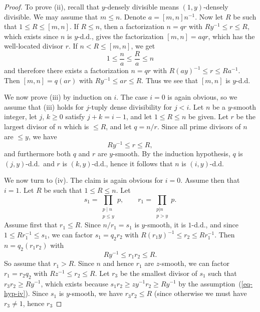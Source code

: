 \documentclass[12pt,a4paper,reqno]{amsart}
\numberwithin{equation}{section}
\theoremstyle{plain}
\theoremstyle{definition}
\begin{document}
\begin{proof}
To prove (ii), recall that $y$-densely divisible means $(1,y)$-densely
divisible. We may assume that $m\leq n$. Denote $a=[m,n]n^{-1}$. Now
let $R$ be such that $1\leq R\leq [m,n]$. If $R\leq n$, then a
factorization $n=qr$ with $Ry^{-1}\leq r\leq R$, which exists since
$n$ is $y$-d.d., gives the factorization $[m,n]=aqr$, which has the
well-located divisor $r$. If $n<R\leq [m,n]$, we get
$$
1\leq \frac{n}{a}\leq \frac{R}{a}\leq n
$$
and therefore there exists a factorization $n=qr$ with $R(ay)^{-1}\leq
r\leq Ra^{-1}$. Then $[m,n]=q(ar)$ with $Ry^{-1}\leq ar\leq R$. Thus
we see that $[m,n]$ is $y$-d.d.
\par
We now prove (iii) by induction on $i$. The case $i=0$ is again
obvious, so we assume that (iii) holds for $j$-tuply dense
divisibility for $j<i$. Let $n$ be a $y$-smooth integer, let $j$,
$k\geq 0$ satisfy $j+k=i-1$, and let $1\leq R\leq n$ be given. Let $r$
be the largest divisor of $n$ which is $\leq R$, and let
$q=n/r$. Since all prime divisors of $n$ are $\leq y$, we have
$$
Ry^{-1}\leq r\leq R,
$$
and furthermore both $q$ and $r$ are $y$-smooth. By the induction hypothesis, $q$ is
$(j,y)$-d.d.\ and $r$ is $(k,y)$-d.d., hence it follows that $n$ is
$(i,y)$-d.d.
\par
We now turn to (iv).  The claim is again obvious for $i=0$.  Assume
then that $i=1$.  Let $R$ be such that $1 \leq R \leq n$.
Let 
$$
s_1=\prod_{\substack{p\mid n\\p\leq y}}p,\quad\quad
r_1=\prod_{\substack{p|n\\ p>y}} p.
$$ 
Assume first that $r_1\leq R$. Since $n/r_1=s_1$ is $y$-smooth, it is
$1$-d.d., and since $1\leq Rr_1^{-1}\leq s_1$, we can factor
$s_1=q_2r_2$ with $R(r_1y)^{-1}\leq r_2\leq Rr_1^{-1}$. Then
$n=q_2(r_1r_2)$ with
$$
Ry^{-1}\leq r_1r_2\leq R.
$$
So assume that $r_1>R$. Since $n$ and hence $r_1$ are $z$-smooth, we
can factor $r_1=r_2q_2$ with $Rz^{-1}\leq r_2\leq R$.
Let $r_3$ be the smallest divisor of $s_1$ such that $r_3 r_2\geq
Ry^{-1}$, which exists because $s_1r_2\geq zy^{-1}r_2\geq Ry^{-1}$ by
the assumption~(\ref{eq-hyp-iv}). Since $s_1$ is $y$-smooth, we have
$r_3 r_2\leq R$ (since otherwise we must have $r_3\neq 1$, hence $r_3$

\end{proof}
\end{document}
